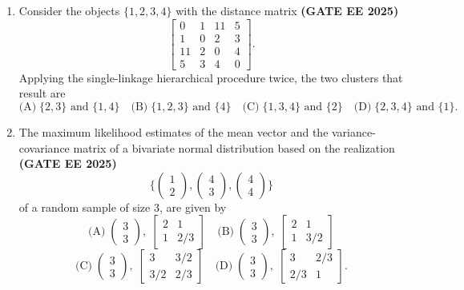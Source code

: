 \documentclass[journal,12pt,onecolumn]{IEEEtran}
\theoremstyle{remark}
\begin{document}
\begin{enumerate}
\item Consider the objects $\{1,2,3,4\}$ with the distance matrix  \hfill \textbf{(GATE EE 2025)}\\
\[
\begin{bmatrix}
0 & 1 & 11 & 5 \\
1 & 0 & 2 & 3 \\
11 & 2 & 0 & 4 \\
5 & 3 & 4 & 0
\end{bmatrix}.
\]
Applying the single-linkage hierarchical procedure twice, the two clusters that result are
\[
\text{(A)} \; \{2,3\} \text{ and } \{1,4\}
\quad
\text{(B)} \; \{1,2,3\} \text{ and } \{4\}
\quad
\text{(C)} \; \{1,3,4\} \text{ and } \{2\}
\quad
\text{(D)} \; \{2,3,4\} \text{ and } \{1\}.
\]


\item The maximum likelihood estimates of the mean vector and the variance-covariance matrix 
of a bivariate normal distribution based on the realization  \hfill \textbf{(GATE EE 2025)}\\
\[
\Big\{ \begin{pmatrix}1 \\ 2 \end{pmatrix}, 
       \begin{pmatrix}4 \\ 3 \end{pmatrix}, 
       \begin{pmatrix}4 \\ 4 \end{pmatrix} \Big\}
\]
of a random sample of size $3$, are given by
\[
\text{(A)} \; 
\begin{pmatrix}3 \\ 3\end{pmatrix}, \;
\begin{bmatrix}
2 & 1 \\
1 & 2/3
\end{bmatrix}
\quad
\text{(B)} \; 
\begin{pmatrix}3 \\ 3\end{pmatrix}, \;
\begin{bmatrix}
2 & 1 \\
1 & 3/2
\end{bmatrix}
\]
\[
\text{(C)} \; 
\begin{pmatrix}3 \\ 3\end{pmatrix}, \;
\begin{bmatrix}
3 & 3/2 \\
3/2 & 2/3
\end{bmatrix}
\quad
\text{(D)} \; 
\begin{pmatrix}3 \\ 3\end{pmatrix}, \;
\begin{bmatrix}
3 & 2/3 \\
2/3 & 1
\end{bmatrix}.
\]


\end{enumerate}
\end{document}
